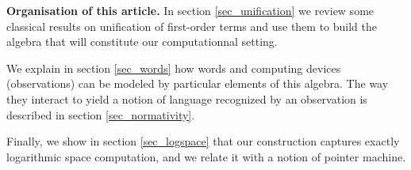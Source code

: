 

\smallskip\noindent
\textbf{Organisation of this article.} In section \ref{sec_unification} we review some classical results on unification of first-order terms and use them to build the algebra that will constitute our computationnal setting.

We explain in section \ref{sec_words} how words and computing devices (observations) can be modeled by particular elements of this algebra. The way they interact to yield a notion of language recognized by an observation is described in section \ref{sec_normativity}.

Finally, we show in section \ref{sec_logspace} that our construction captures exactly logarithmic space computation, and we relate it with a notion of pointer machine.
